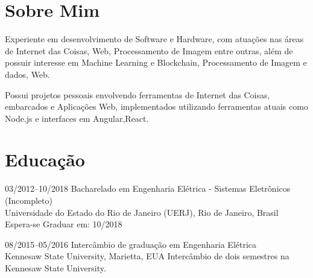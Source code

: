 \documentclass[]{friggeri-cv} %
\begin{document}
\section{Sobre Mim}

Experiente em desenvolvimento de Software e Hardware, com atuações nas áreas de Internet das Coisas, Web, Processamento de Imagem entre outras, além de possuir interesse em Machine Learning e Blockchain, Processamento de Imagem e dados, Web.

Possui projetos pessoais envolvendo ferramentas de Internet das Coisas, embarcados e Aplicações Web, implementados utilizando ferramentas atuais como Node.js e interfaces em Angular,React.

\section{Educação}

\begin{entrylist}


\entry
{03/2012--10/2018}
{\hspace{.25cm} Bacharelado em Engenharia Elétrica - Sistemas Eletrônicos (Incompleto)}
{\\Universidade do Estado do Rio de Janeiro (UERJ), Rio de Janeiro, Brasil}
{Espera-se Graduar em: 10/2018 \\ \color{red}{CR = 7.85/10.0} }


\entry
{08/2015--05/2016}
{\hspace{.25cm} Intercâmbio de graduação em Engenharia Elétrica}
{\\Kennesaw State University, Marietta, EUA}
{Intercâmbio de dois semestres na Kennesaw State University.  \\
\color{red}{GPA = 3.9/4.0} }


\end{entrylist}

\end{document}
